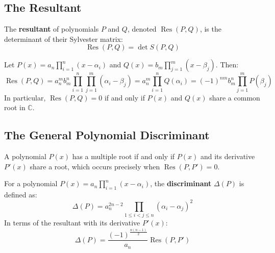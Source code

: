 \documentclass[a4paper]{article}
\begin{document}
\subsection{The Resultant}

\begin{definition}[Resultant]\label{eps:def:resultant}
The \textbf{resultant} of polynomials $P$ and $Q$, denoted $\operatorname{Res}(P, Q)$, is the determinant of their Sylvester matrix:
\begin{equation}
    \operatorname{Res}(P, Q) = \det S(P, Q)
\end{equation}
\end{definition}

\begin{theorem}\label{eps:thm:resultant-roots}
Let $P(x) = a_n \prod_{i=1}^n (x - \alpha_i)$ and $Q(x) = b_m \prod_{j=1}^m (x - \beta_j)$. Then:
\begin{equation}
    \operatorname{Res}(P, Q) = a_n^m b_m^n \prod_{i=1}^n \prod_{j=1}^m (\alpha_i - \beta_j) = a_n^m \prod_{i=1}^n Q(\alpha_i) = (-1)^{nm} b_m^n \prod_{j=1}^m P(\beta_j)
\end{equation}
In particular, $\operatorname{Res}(P, Q) = 0$ if and only if $P(x)$ and $Q(x)$ share a common root in $\mathbb{C}$.
\end{theorem}

\subsection{The General Polynomial Discriminant}

A polynomial $P(x)$ has a multiple root if and only if $P(x)$ and its derivative $P'(x)$ share a root, which occurs precisely when $\operatorname{Res}(P, P') = 0$.

\begin{definition}\label{eps:def:polynomial-discriminant}
For a polynomial $P(x) = a_n \prod_{i=1}^n (x - \alpha_i)$, the \textbf{discriminant} $\Delta(P)$ is defined as:
\begin{equation}
    \Delta(P) = a_n^{2n-2} \prod_{1 \le i < j \le n} (\alpha_i - \alpha_j)^2
\end{equation}
In terms of the resultant with its derivative $P'(x)$:
\begin{equation}
    \boxed{\Delta(P) = \frac{(-1)^{\frac{n(n-1)}{2}}}{a_n} \operatorname{Res}(P, P')}
\end{equation}
\end{definition}
\end{document}
